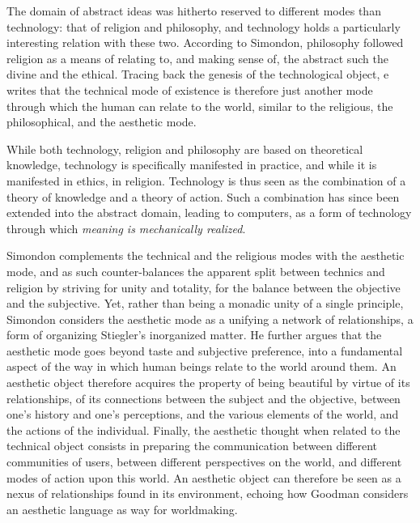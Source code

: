 The domain of abstract ideas was hitherto reserved to different modes than technology: that of religion and philosophy, and technology holds a particularly interesting relation with these two. According to Simondon, philosophy followed religion as a means of relating to, and making sense of, the abstract such the divine and the ethical. Tracing back the genesis of the technological object, e writes that the technical mode of existence is therefore just another mode through which the human can relate to the world, similar to the religious, the philosophical, and the aesthetic mode\citep{simondon_mode_1958}.

While both technology, religion and philosophy are based on theoretical knowledge, technology is specifically manifested in practice, and while it is manifested in ethics, in religion. Technology is thus seen as the combination of a theory of knowledge and a theory of action. Such a combination has since been extended into the abstract domain, leading to computers, as a form of technology through which \emph{meaning is mechanically realized}.


Simondon complements the technical and the religious modes with the aesthetic mode, and as such counter-balances the apparent split between technics and religion by striving for unity and totality, for the balance between the objective and the subjective. Yet, rather than being a monadic unity of a single principle, Simondon considers the aesthetic mode as a unifying a network of relationships, a form of organizing Stiegler's inorganized matter. He further argues that the aesthetic mode goes beyond taste and subjective preference, into a fundamental aspect of the way in which human beings relate to the world around them. An aesthetic object therefore acquires the property of being beautiful by virtue of its relationships, of its connections between the subject and the objective, between one's history and one's perceptions, and the various elements of the world, and the actions of the individual. Finally, the aesthetic thought when related to the technical object consists in preparing the communication between different communities of users, between different perspectives on the world, and different modes of action upon this world. An aesthetic object can therefore be seen as a nexus of relationships found in its environment, echoing how Goodman considers an aesthetic language as way for worldmaking.

